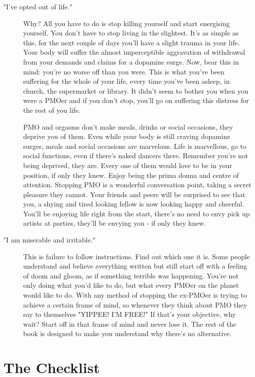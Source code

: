 \documentclass[easypeasy.tex]{subfiles}
\begin{document}
\begin{description}
\begin{description}
      \item ["I've opted out of life."] Why? All you have to do is stop killing yourself and start energising yourself. You don't have to stop living in the slightest. It's as simple as this, for the next couple of days you'll have a slight trauma in your life. Your body will suffer the almost imperceptible aggravation of withdrawal from your demands and claims for a dopamine surge. Now, bear this in mind: you're no worse off than you were. This is what you've been suffering for the whole of your life, every time you've been asleep, in church, the supermarket or library. It didn't seem to bother you when you were a PMOer and if you don't stop, you'll go on suffering this distress for the rest of you life.

      PMO and orgasms don't make meals, drinks or social occasions, they deprive you of them. Even while your body is still craving dopamine surges, meals and social occasions are marvelous. Life is marvellous, go to social functions, even if there's naked dancers there. Remember you're not being deprived, they are. Every one of them would love to be in your position, if only they knew. Enjoy being the prima donna and centre of attention. Stopping PMO is a wonderful conversation point, taking a secret pleasure they cannot. Your friends and peers will be surprised to see that you, a shying and tired looking fellow is now looking happy and cheerful. You'll be enjoying life right from the start, there's no need to envy pick up artists at parties, they'll be envying you - if only they knew.

     \item ["I am miserable and irritable."] This is failure to follow instructions. Find out which one it is. Some people understand and believe everything written but still start off with a feeling of doom and gloom, as if something terrible was happening. You're not only doing what you'd like to do, but what every PMOer on the planet would like to do. With any method of stopping the ex-PMOer is trying to achieve a certain frame of mind, so whenever they think about PMO they say to themselves "YIPPEE! I'M FREE!" If that's your objective, why wait? Start off in that frame of mind and never lose it. The rest of the book is designed to make you understand why there's no alternative.

\end{description}
\end{description}

\section{The Checklist}
\end{document}
